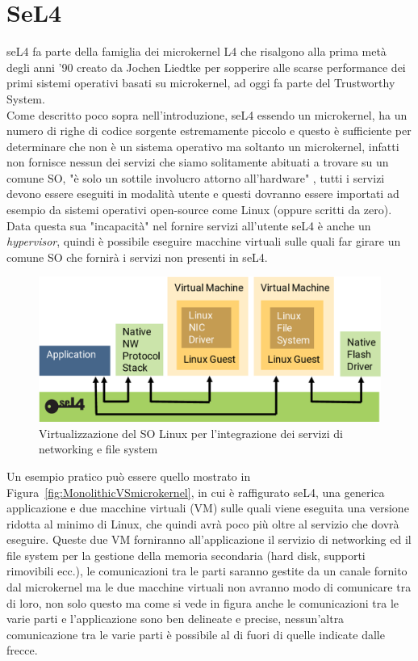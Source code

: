 \chapter{SeL4}
seL4 fa parte della famiglia dei microkernel L4 che risalgono alla prima metà degli anni '90 creato da Jochen Liedtke per sopperire alle scarse performance dei primi sistemi operativi basati su microkernel, ad oggi fa parte del Trustworthy System.\\
Come descritto poco sopra nell'introduzione, seL4 essendo un microkernel, ha un numero di righe di codice sorgente estremamente piccolo e questo è sufficiente per determinare che non è un sistema operativo ma soltanto un microkernel, infatti non fornisce nessun dei servizi che siamo solitamente abituati a trovare su un comune SO, "è solo un sottile involucro attorno all'hardware" \cite{sel4-whitepaper}, tutti i servizi devono essere eseguiti in modalità utente e questi dovranno essere importati ad esempio da sistemi operativi open-source come Linux (oppure scritti da zero). Data questa sua "incapacità" nel fornire servizi all'utente seL4 è anche un \textit{hypervisor}, quindi è possibile eseguire macchine virtuali sulle quali far girare un comune SO che fornirà i servizi non presenti in seL4.
\begin{figure}[h]
  \includegraphics[width=\linewidth]{img/seL4Hypervisor.png}
  \caption{Virtualizzazione del SO Linux per l'integrazione dei servizi di networking e file system}
  \label{fig:Virtualizzazione}
\end{figure}

Un esempio pratico può essere quello mostrato in Figura~\ref{fig:MonolithicVSmicrokernel}, in cui è raffigurato seL4, una generica applicazione e due macchine virtuali (VM) sulle quali viene eseguita una versione ridotta al minimo di Linux, che quindi avrà poco più oltre al servizio che dovrà eseguire.
Queste due VM forniranno all'applicazione il servizio di networking ed il file system per la gestione della memoria secondaria (hard disk, supporti rimovibili ecc.), le comunicazioni tra le parti saranno gestite da un canale fornito dal microkernel ma le due macchine virtuali non avranno modo di comunicare tra di loro, non solo questo ma come si vede in figura anche le comunicazioni tra le varie parti e l'applicazione sono ben delineate e precise, nessun'altra comunicazione tra le varie parti è possibile al di fuori di quelle indicate dalle frecce.

